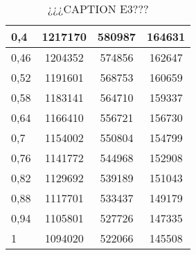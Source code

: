 \begin{table}[H]
\begin{tabular}{llll}
		\multicolumn{1}{|l|}{0,4} & \multicolumn{1}{c|}{1217170}  & \multicolumn{1}{c|}{580987} & \multicolumn{1}{c|}{164631}\\ \hline
		\multicolumn{1}{|l|}{0,46} & \multicolumn{1}{c|}{1204352} & \multicolumn{1}{c|}{574856} & \multicolumn{1}{c|}{162647}\\ \hline
		\multicolumn{1}{|l|}{0,52} & \multicolumn{1}{c|}{1191601} & \multicolumn{1}{c|}{568753} & \multicolumn{1}{c|}{160659}\\ \hline
		\multicolumn{1}{|l|}{0,58} & \multicolumn{1}{c|}{1183141} & \multicolumn{1}{c|}{564710} & \multicolumn{1}{c|}{159337}\\ \hline
		\multicolumn{1}{|l|}{0,64} & \multicolumn{1}{c|}{1166410}   & \multicolumn{1}{c|}{556721} & \multicolumn{1}{c|}{156730}\\ \hline
		\multicolumn{1}{|l|}{0,7} & \multicolumn{1}{c|}{1154002}  & \multicolumn{1}{c|}{550804} & \multicolumn{1}{c|}{154799}\\ \hline
		\multicolumn{1}{|l|}{0,76} & \multicolumn{1}{c|}{1141772} & \multicolumn{1}{c|}{544968} & \multicolumn{1}{c|}{152908}\\ \hline
		\multicolumn{1}{|l|}{0,82} & \multicolumn{1}{c|}{1129692} & \multicolumn{1}{c|}{539189} & \multicolumn{1}{c|}{151043}\\ \hline
		\multicolumn{1}{|l|}{0,88} & \multicolumn{1}{c|}{1117701} & \multicolumn{1}{c|}{533437} & \multicolumn{1}{c|}{149179}\\ \hline
		\multicolumn{1}{|l|}{0,94} & \multicolumn{1}{c|}{1105801} & \multicolumn{1}{c|}{527726} & \multicolumn{1}{c|}{147335}\\ \hline
		\multicolumn{1}{|l|}{1} & \multicolumn{1}{c|}{1094020} & \multicolumn{1}{c|}{522066} & \multicolumn{1}{c|}{145508}\\ \hline
	\end{tabular}
	\caption{¿¿¿CAPTION E3???}
	\label{table_e3}
\end{table}

